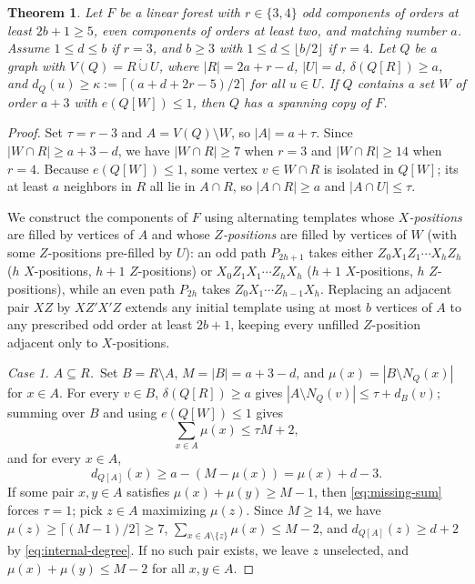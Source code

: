 \documentclass[10pt]{article}
\theoremstyle{compactplain}
\newtheorem{theorem}{Theorem}[section]
\theoremstyle{remark}\newtheorem{remark}[theorem]{Remark}
\begin{document}
\begin{theorem}\label{thm:factor-from-W}
Let $F$ be a linear forest with $r\in\{3,4\}$ odd components of orders
at least $2b+1\ge5$, even components of orders at least two, and
matching number $a$. Assume $1\le d\le b$ if $r=3$, and $b\ge3$ with
$1\le d\le\lfloor b/2\rfloor$ if $r=4$. Let $Q$ be a graph with
$V(Q)=R\dot\cup U$, where $|R|=2a+r-d$, $|U|=d$, $\delta(Q[R])\ge a$,
and $d_Q(u)\ge\kappa:=\lceil(a+d+2r-5)/2\rceil$ for all $u\in U$. If $Q$
contains a set $W$ of order $a+3$ with $e(Q[W])\le1$, then $Q$ has a
spanning copy of $F$.
\end{theorem}
\begin{proof}
Set $\tau=r-3$ and $A=V(Q)\setminus W$, so $|A|=a+\tau$. Since
$|W\cap R|\ge a+3-d$, we have $|W\cap R|\ge7$ when $r=3$ and
$|W\cap R|\ge14$ when $r=4$. Because $e(Q[W])\le1$, some vertex
$v\in W\cap R$ is isolated in $Q[W]$; its at least $a$ neighbors in $R$
all lie in $A\cap R$, so $|A\cap R|\ge a$ and $|A\cap U|\le\tau$.

We construct the components of $F$ using alternating templates whose
\emph{$X$-positions} are filled by vertices of $A$ and whose
\emph{$Z$-positions} are filled by vertices of $W$ (with some
$Z$-positions pre-filled by $U$): an odd path $P_{2h+1}$ takes either
$Z_0X_1Z_1\cdots X_hZ_h$ ($h$ $X$-positions, $h+1$ $Z$-positions) or
$X_0Z_1X_1\cdots Z_hX_h$ ($h+1$ $X$-positions, $h$ $Z$-positions), while
an even path $P_{2h}$ takes $Z_0X_1\cdots Z_{h-1}X_h$. Replacing an
adjacent pair $XZ$ by $XZ'X'Z$ extends any initial template using at
most $b$ vertices of $A$ to any prescribed odd order at least $2b+1$,
keeping every unfilled $Z$-position adjacent only to $X$-positions.

\medskip\noindent\emph{Case 1. $A\subseteq R$.}\ 
Set $B=R\setminus A$, $M=|B|=a+3-d$, and $\mu(x)=|B\setminus N_Q(x)|$
for $x\in A$. For every $v\in B$, $\delta(Q[R])\ge a$ gives
$|A\setminus N_Q(v)|\le\tau+d_B(v)$; summing over $B$ and using
$e(Q[W])\le1$ gives
\begin{equation}\label{eq:missing-sum}
 \sum_{x\in A}\mu(x)\le\tau M+2,
\end{equation}
and for every $x\in A$,
\begin{equation}\label{eq:internal-degree}
 d_{Q[A]}(x)\ge a-(M-\mu(x))=\mu(x)+d-3.
\end{equation}
If some pair $x,y\in A$ satisfies $\mu(x)+\mu(y)\ge M-1$, then
\eqref{eq:missing-sum} forces $\tau=1$; pick $z\in A$ maximizing
$\mu(z)$. Since $M\ge14$, we have $\mu(z)\ge\lceil(M-1)/2\rceil\ge7$,
$\sum_{x\in A\setminus\{z\}}\mu(x)\le M-2$, and
$d_{Q[A]}(z)\ge d+2$ by \eqref{eq:internal-degree}. If no such pair
exists, we leave $z$ unselected, and $\mu(x)+\mu(y)\le M-2$ for all
$x,y\in A$.


\end{proof}
\end{document}

